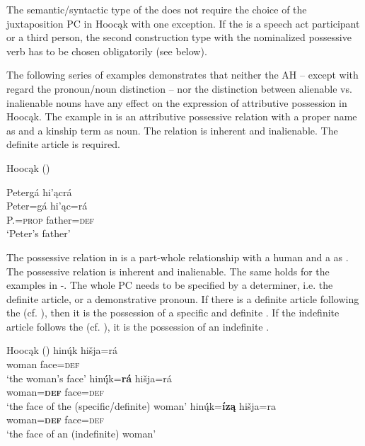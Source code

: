 \documentclass[output=paper]{LSP/langsci}
\begin{document}
The semantic/syntactic type of the  does not require the choice of the juxtaposition PC in Hoocąk with one exception. If the  is a speech act participant or a third person, the second construction type with the nominalized possessive verb has to be chosen obligatorily (see  below).

The following series of examples demonstrates that neither the AH – except with regard the pronoun/noun distinction – nor the distinction between alienable vs. inalienable nouns have any effect on the expression of attributive possession in Hoocąk. The example in  is an attributive possessive relation with a proper name as  and a kinship term as  noun. The relation is inherent and inalienable. The definite article is required.

\ea {}Hoocąk (\citealt[16]{Helmbrecht2003}) \label{petersfather}

\glll Petergá hi'\k{a}crá\\
Peter=gá       hi'\k{a}c=rá \\
  P.=\textsc{prop} father=\textsc{def} \\
\glt`Peter's father'
\z

The possessive relation in  is a part-whole relationship with a human  and a  as . The possessive relation is inherent and inalienable. The same holds for the examples in -. The whole PC needs to be specified by a determiner, i.e. the definite article, or a demonstrative pronoun. If there is a definite article following the  (cf. ), then it is the possession of a specific and definite . If the indefinite article follows the  (cf. ), it is the possession of an indefinite . 

\ea {}Hoocąk (\citealt[13]{Helmbrecht2003})\label{womansface}
\ea \label{womansfacea}
\gll hinų́k    hišja=rá \\
woman face=\textsc{def} \\
\glt `the woman's face'
\ex\label{womansfaceb}
\gll hinų́́k=\textbf{rá}         hišja=rá \\
woman=\textbf{\textsc{def}} face=\textsc{def} \\
\trans `the face of the (specific/definite) woman'
\ex\label{womansfacec}
\gll hinų́́k=\textbf{íz\k{a}} hišja=ra \\
woman=\textbf{\textsc{def}}  face=\textsc{def} \\ 
\glt `the face of an (indefinite) woman'
\z
\z
\end{document}
